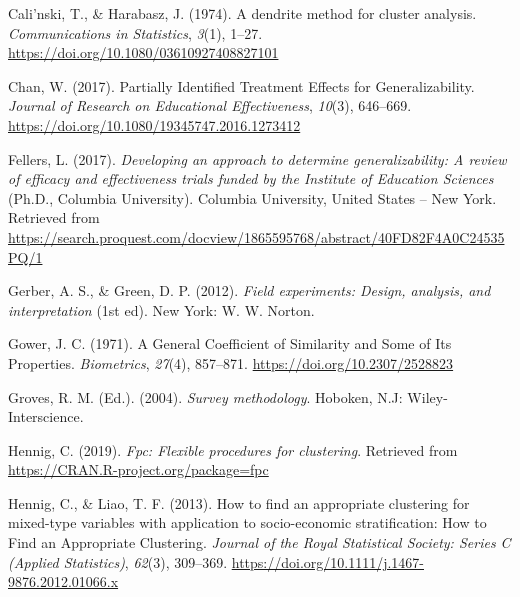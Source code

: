 \documentclass[
  english,
  man,floatsintext]{apa6}
\newlength{\cslhangindent}
\newlength{\cslentryspacingunit} %
\newenvironment{CSLReferences}[2] %
 {%
  \setlength{\parindent}{0pt}
  \ifodd #1
  \let\oldpar\par
  \def\par{\hangindent=\cslhangindent\oldpar}
  \fi
  \setlength{\parskip}{#2\cslentryspacingunit}
 }%
 {}
\begin{document}
\begingroup
\setlength{\parindent}{-0.5in}
\setlength{\leftskip}{0.5in}

\hypertarget{refs}{}
\begin{CSLReferences}{1}{0}
\leavevmode{}%
Cali'nski, T., \& Harabasz, J. (1974). A dendrite method for cluster analysis. \emph{Communications in Statistics}, \emph{3}(1), 1--27. \url{https://doi.org/10.1080/03610927408827101}

\leavevmode{}%
Chan, W. (2017). Partially {Identified} {Treatment} {Effects} for {Generalizability}. \emph{Journal of Research on Educational Effectiveness}, \emph{10}(3), 646--669. \url{https://doi.org/10.1080/19345747.2016.1273412}

\leavevmode{}%
Fellers, L. (2017). \emph{Developing an approach to determine generalizability: {A} review of efficacy and effectiveness trials funded by the {Institute} of {Education Sciences}} (Ph.D., Columbia University). Columbia University, United States -- New York. Retrieved from \url{https://search.proquest.com/docview/1865595768/abstract/40FD82F4A0C24535PQ/1}

\leavevmode{}%
Gerber, A. S., \& Green, D. P. (2012). \emph{Field experiments: Design, analysis, and interpretation} (1st ed). New York: W. W. Norton.

\leavevmode{}%
Gower, J. C. (1971). A {General Coefficient} of {Similarity} and {Some} of {Its Properties}. \emph{Biometrics}, \emph{27}(4), 857--871. \url{https://doi.org/10.2307/2528823}

\leavevmode{}%
Groves, R. M. (Ed.). (2004). \emph{Survey methodology}. Hoboken, N.J: Wiley-Interscience.

\leavevmode{}%
Hennig, C. (2019). \emph{Fpc: Flexible procedures for clustering}. Retrieved from \url{https://CRAN.R-project.org/package=fpc}

\leavevmode{}%
Hennig, C., \& Liao, T. F. (2013). How to find an appropriate clustering for mixed-type variables with application to socio-economic stratification: {How} to {Find} an {Appropriate Clustering}. \emph{Journal of the Royal Statistical Society: Series C (Applied Statistics)}, \emph{62}(3), 309--369. \url{https://doi.org/10.1111/j.1467-9876.2012.01066.x}


\end{CSLReferences}
\end{document}
